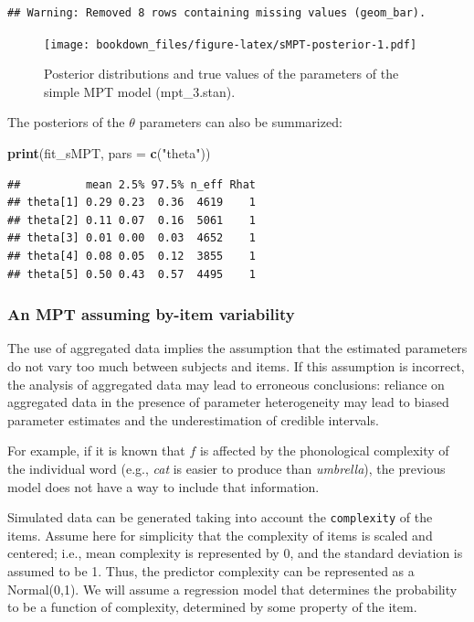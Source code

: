 \documentclass[12pt,]{krantz}
\newenvironment{Shaded}{\begin{snugshade}}{\end{snugshade}}
\newcommand{\KeywordTok}[1]{\textcolor[rgb]{0.13,0.29,0.53}{\textbf{#1}}}
\newcommand{\DataTypeTok}[1]{\textcolor[rgb]{0.13,0.29,0.53}{#1}}
\newcommand{\StringTok}[1]{\textcolor[rgb]{0.31,0.60,0.02}{#1}}
\newcommand{\NormalTok}[1]{#1}
\theoremstyle{definition}
\theoremstyle{definition}
\theoremstyle{definition}
\theoremstyle{remark}
\begin{document}
\begin{verbatim}
## Warning: Removed 8 rows containing missing values (geom_bar).
\end{verbatim}

\begin{figure}
\centering
\texttt{[image: bookdown\_files/figure-latex/sMPT-posterior-1.pdf]}
\caption{\label{fig:sMPT-posterior}Posterior distributions and true values
of the parameters of the simple MPT model (mpt\_3.stan).}
\end{figure}

The posteriors of the \(\theta\) parameters can also be summarized:

\begin{Shaded}
\begin{Highlighting}[]
\KeywordTok{print}\NormalTok{(fit_sMPT, }\DataTypeTok{pars =} \KeywordTok{c}\NormalTok{(}\StringTok{"theta"}\NormalTok{))}
\end{Highlighting}
\end{Shaded}

\begin{verbatim}
##          mean 2.5% 97.5% n_eff Rhat
## theta[1] 0.29 0.23  0.36  4619    1
## theta[2] 0.11 0.07  0.16  5061    1
## theta[3] 0.01 0.00  0.03  4652    1
## theta[4] 0.08 0.05  0.12  3855    1
## theta[5] 0.50 0.43  0.57  4495    1
\end{verbatim}

\subsubsection{An MPT assuming by-item variability}\label{sec:MPT-reg}

The use of aggregated data implies the assumption that the estimated
parameters do not vary too much between subjects and items. If this
assumption is incorrect, the analysis of aggregated data may lead to
erroneous conclusions: reliance on aggregated data in the presence of
parameter heterogeneity may lead to biased parameter estimates and the
underestimation of credible intervals.

For example, if it is known that \(f\) is affected by the phonological
complexity of the individual word (e.g., \emph{cat} is easier to produce
than \emph{umbrella}), the previous model does not have a way to include
that information.

Simulated data can be generated taking into account the
\texttt{complexity} of the items. Assume here for simplicity that the
complexity of items is scaled and centered; i.e., mean complexity is
represented by 0, and the standard deviation is assumed to be 1. Thus,
the predictor complexity can be represented as a Normal(0,1). We will
assume a regression model that determines the probability to be a
function of complexity, determined by some property of the item.
\end{document}
